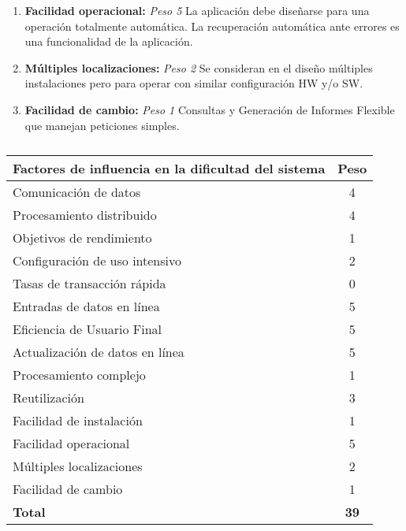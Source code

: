 \documentclass[11pt,a4paper,spanish,twoside]{book}
\begin{document}
\begin{enumerate}[{\bf 1.}]
\item {\bf Facilidad operacional:} \emph{Peso 5} La aplicación debe diseñarse
  para una operación totalmente automática. La recuperación automática ante
  errores es una funcionalidad de la aplicación. 

\item {\bf Múltiples localizaciones:} \emph{Peso 2} Se consideran en el
  diseño múltiples instalaciones pero para operar con similar configuración
  HW y/o SW. 

\item {\bf Facilidad de cambio:} \emph{Peso 1} Consultas y Generación de
  Informes Flexible que manejan peticiones simples.

\end{enumerate}

\begin{table}[!ht]
  \centering
  \begin{tabular}{|l|c|}
    \hline
    \textbf{Factores de influencia en la dificultad del sistema} & 
    \textbf{Peso} \\
    \hline \hline
    Comunicación de datos           & 4 \\ \hline
    Procesamiento distribuido       & 4 \\ \hline
    Objetivos de rendimiento        & 1 \\ \hline
    Configuración de uso intensivo  & 2 \\ \hline
    Tasas de transacción rápida     & 0 \\ \hline
    Entradas de datos en línea      & 5 \\ \hline
    Eficiencia de Usuario Final     & 5 \\ \hline
    Actualización de datos en línea & 5 \\ \hline
    Procesamiento complejo          & 1 \\ \hline
    Reutilización                   & 3 \\ \hline
    Facilidad de instalación        & 1 \\ \hline
    Facilidad operacional           & 5 \\ \hline
    Múltiples localizaciones        & 2 \\ \hline
    Facilidad de cambio             & 1 \\ \hline \hline
    \textbf{Total}                  & \textbf{39} \\ \hline
  \end{tabular}
  \label{}
  \caption{}
\end{table}
\end{document}
